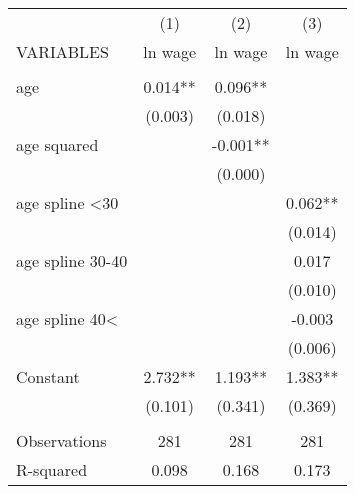 \begin{tabular}{lccc} \hline
 & (1) & (2) & (3) \\
VARIABLES & ln wage & ln wage & ln wage \\ \hline
 &  &  &  \\
age & 0.014** & 0.096** &  \\
 & (0.003) & (0.018) &  \\
age squared &  & -0.001** &  \\
 &  & (0.000) &  \\
age spline <30 &  &  & 0.062** \\
 &  &  & (0.014) \\
age spline 30-40 &  &  & 0.017 \\
 &  &  & (0.010) \\
age spline 40< &  &  & -0.003 \\
 &  &  & (0.006) \\
Constant & 2.732** & 1.193** & 1.383** \\
 & (0.101) & (0.341) & (0.369) \\
 &  &  &  \\
Observations & 281 & 281 & 281 \\
 R-squared & 0.098 & 0.168 & 0.173 \\ \hline
\end{tabular}
